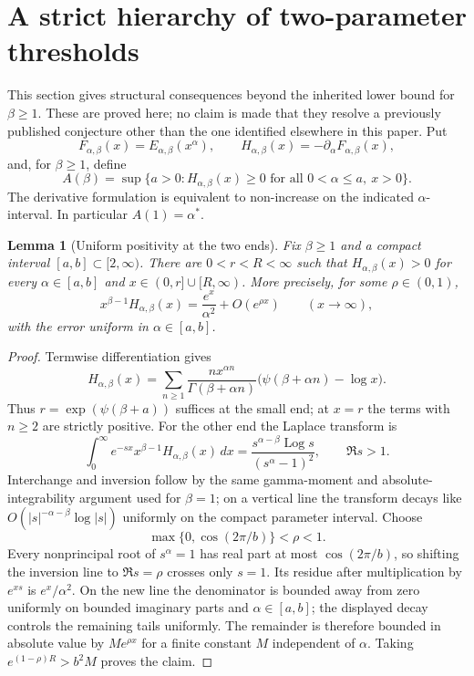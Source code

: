 \documentclass[11pt,a4paper]{article}
\theoremstyle{plain}
\newtheorem{lemma}[theorem]{Lemma}
\theoremstyle{remark}
\DeclareMathOperator{\Log}{Log}
\begin{document}
\section{A strict hierarchy of two-parameter thresholds}
\label{sec:beta-hierarchy}
This section gives structural consequences beyond the inherited lower bound for
$\beta\geq1$. These are proved here; no claim is made that they resolve a previously
published conjecture other than the one identified elsewhere in this paper.
Put
\[
 F_{\alpha,\beta}(x)=E_{\alpha,\beta}(x^\alpha),\qquad
 H_{\alpha,\beta}(x)=-\partial_\alpha F_{\alpha,\beta}(x),
\]
and, for $\beta\geq1$, define
\[
 A(\beta)=\sup\{a>0: H_{\alpha,\beta}(x)\geq0
                 \text{ for all }0<\alpha\leq a,\ x>0\}.
\]
The derivative formulation is equivalent to non-increase on the indicated
$\alpha$-interval. In particular $A(1)=\alpha^*$.

\begin{lemma}[Uniform positivity at the two ends]\label{lem:beta-ends}
Fix $\beta\geq1$ and a compact interval $[a,b]\subset[2,\infty)$.
There are $0<r<R<\infty$ such that
$H_{\alpha,\beta}(x)>0$ for every $\alpha\in[a,b]$ and
$x\in(0,r]\cup[R,\infty)$. More precisely, for some $\rho\in(0,1)$,
\[
 x^{\beta-1}H_{\alpha,\beta}(x)
       =\frac{e^x}{\alpha^2}+O(e^{\rho x})
       \qquad (x\to\infty),
\]
with the error uniform in $\alpha\in[a,b]$.
\end{lemma}
\begin{proof}
Termwise differentiation gives
\[
 H_{\alpha,\beta}(x)=\sum_{n\geq1}
 \frac{n x^{\alpha n}}{\Gamma(\beta+\alpha n)}
       \bigl(\psi(\beta+\alpha n)-\log x\bigr).
\]
Thus $r=\exp(\psi(\beta+a))$ suffices at the small end; at $x=r$
the terms with $n\geq2$ are strictly positive.
For the other end the Laplace transform is
\[
 \int_0^\infty e^{-sx}x^{\beta-1}H_{\alpha,\beta}(x)\,dx
   =\frac{s^{\alpha-\beta}\Log s}{(s^\alpha-1)^2},
       \qquad \Re s>1.
\]
Interchange and inversion follow by the same gamma-moment and absolute-integrability
argument used for $\beta=1$; on a vertical line the transform decays like
$O(|s|^{-\alpha-\beta}\log|s|)$ uniformly on the compact parameter interval.
Choose
\[
 \max\{0,\cos(2\pi/b)\}<\rho<1.
\]
Every nonprincipal root of $s^\alpha=1$ has real part at most
$\cos(2\pi/b)$, so shifting the inversion line to $\Re s=\rho$
crosses only $s=1$. Its residue after multiplication by $e^{xs}$ is
$e^x/\alpha^2$. On the new line the denominator is bounded away from zero
uniformly on bounded imaginary parts and $\alpha\in[a,b]$; the displayed decay
controls the remaining tails uniformly. The remainder is therefore bounded
in absolute value by $M e^{\rho x}$ for a finite constant $M$ independent of
$\alpha$. Taking $e^{(1-\rho)R}>b^2M$ proves the claim.
\end{proof}
\end{document}
